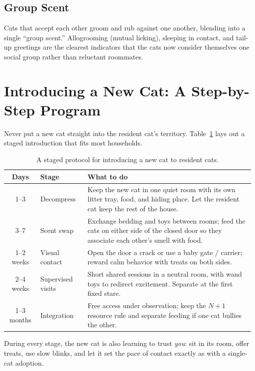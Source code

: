 \documentclass[12pt,a4paper]{article}
\begin{document}
\subsection{Group Scent}
Cats that accept each other groom and rub against one another, blending into a single
``group scent.'' Allogrooming (mutual licking), sleeping in contact, and tail-up
greetings are the clearest indicators that the cats now consider themselves one social
group rather than reluctant roommates.

\section{Introducing a New Cat: A Step-by-Step Program}
\label{sec:program}
Never put a new cat straight into the resident cat's territory. Table~\ref{tab:program}
lays out a staged introduction that fits most households.

\begin{table}[h]
\centering
\caption{A staged protocol for introducing a new cat to resident cats.}
\label{tab:program}
\begin{tabular}{@{}clp{8.5cm}@{}}
\toprule
\textbf{Days} & \textbf{Stage} & \textbf{What to do} \\
\midrule
1--3 & Decompress & Keep the new cat in one quiet room with its own litter tray, food, and hiding place. Let the resident cat keep the rest of the house. \\
3--7 & Scent swap & Exchange bedding and toys between rooms; feed the cats on either side of the closed door so they associate each other's smell with food. \\
1--2 weeks & Visual contact & Open the door a crack or use a baby gate / carrier; reward calm behavior with treats on both sides. \\
2--4 weeks & Supervised visits & Short shared sessions in a neutral room, with wand toys to redirect excitement. Separate at the first fixed stare. \\
1--3 months & Integration & Free access under observation; keep the $N+1$ resource rule and separate feeding if one cat bullies the other. \\
\bottomrule
\end{tabular}
\end{table}

During every stage, the new cat is also learning to trust \emph{you}: sit in its room,
offer treats, use slow blinks, and let it set the pace of contact exactly as with a
single-cat adoption.
\end{document}
